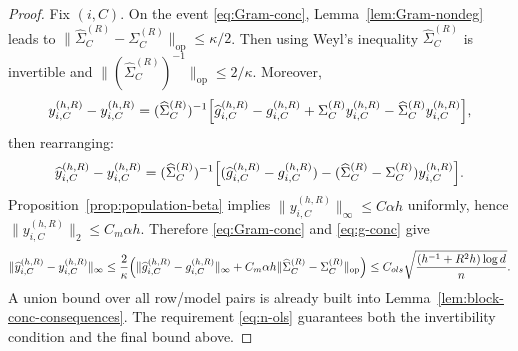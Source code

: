 \documentclass{article}
\begin{document}
\begin{proof}
Fix $(i,C)$. On the event \eqref{eq:Gram-conc}, Lemma~\ref{lem:Gram-nondeg} leads to $\|\widehat\Sigma_C^{(R)}-\Sigma_C^{(R)}\|_{\text{op}}\le \kappa/2$. Then using Weyl's inequality $\widehat\Sigma_C^{(R)}$ is invertible and $\|(\widehat\Sigma_C^{(R)})^{-1}\|_{\text{op}}\le 2/\kappa$. Moreover, \[
y_{i,C}^{(h,R)}-y_{i,C}^{(h,R)}=(\widehat\Sigma_C^{(R)})^{-1}\Bigl[\widehat g_{i,C}^{(h,R)}-g_{i,C}^{(h,R)} + \Sigma_C^{(R)}y_{i,C}^{(h,R)} -\widehat\Sigma_C^{(R)}y_{i,C}^{(h,R)}\Bigr],
\]
then rearranging:
\[
\widehat y_{i,C}^{(h,R)}-y_{i,C}^{(h,R)}=
(\widehat\Sigma_C^{(R)})^{-1}\Bigl[(\widehat g_{i,C}^{(h,R)}-g_{i,C}^{(h,R)}) - (\widehat\Sigma_C^{(R)}-\Sigma_C^{(R)})y_{i,C}^{(h,R)}\Bigr].
\]
Proposition~\ref{prop:population-beta} implies $\|y_{i,C}^{(h,R)}\|_\infty\le C\alpha h$ uniformly, hence $\|y_{i,C}^{(h,R)}\|_2\le C_{m}\alpha h$. Therefore \eqref{eq:Gram-conc} and \eqref{eq:g-conc} give
\[
\|\widehat y_{i,C}^{(h,R)}-y_{i,C}^{(h,R)}\|_\infty
\le
\frac{2}{\kappa}
\Bigl(
\|\widehat g_{i,C}^{(h,R)}-g_{i,C}^{(h,R)}\|_\infty + C_m\alpha h\|\widehat\Sigma_C^{(R)}-\Sigma_C^{(R)}\|_{\text{op}}\Bigr)
\le C_{ols}\sqrt{\frac{(h^{-1}+R^2 h)\log d}{n}}.
\]
A union bound over all row/model pairs is already built into Lemma~\ref{lem:block-conc-consequences}. The requirement \eqref{eq:n-ols} guarantees both the invertibility condition and the final bound above.
\end{proof}
\end{document}
